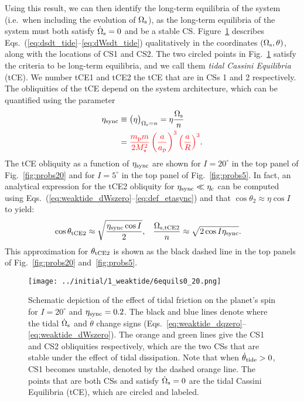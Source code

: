 \documentclass[
        fleqn,
        usenatbib,
    ]{mnras}
\newcommand*{\p}[1]{\left(#1\right)}
\begin{document}
Using this result, we can then identify the long-term equilibria of the system
(i.e.\ when including the evolution of $\Omega_{\rm s}$), as the long-term
equilibria of the system must both satisfy $\dot{\Omega}_{\rm s} = 0$ and be a
stable CS\@. Figure~\ref{fig:6equils} describes
Eqs.~(\ref{eq:dsdt_tide}--\ref{eq:dWsdt_tide}) qualitatively in the coordinates
$(\Omega_{\rm s}, \theta)$, along with the locations of CS1 and CS2. The two
circled points in Fig.~\ref{fig:6equils} satisfy the criteria to be long-term
equilibria, and we call them \emph{tidal Cassini Equilibria} (tCE). We number
tCE1 and tCE2 the tCE that are in CSs 1 and 2 respectively. The obliquities of
the tCE depend on the system architecture, which can be quantified using the
parameter
\begin{align}
    \eta_{\rm sync} &\equiv \big(\eta\big)_{\Omega_{\rm s} = n}
        = \eta \frac{\Omega_{\rm s}}{n}\nonumber\\
        &= \textcolor{red}{\frac{m_{\rm p}m}{2M_\star^2}\p{\frac{a}{a_{\rm
            p}}}^3 \p{\frac{a}{R}}^3}. \label{eq:def_etasync}
\end{align}
The tCE obliquity as a function of $\eta_{\rm sync}$ are shown for $I =
20^\circ$ in the top panel of Fig.~\ref{fig:probs20} and for $I = 5^\circ$ in
the top panel of Fig.~\ref{fig:probs5}. In fact, an analytical expression for
the tCE2 obliquity for $\eta_{\rm sync} \ll \eta_{\rm c}$ can be computed using
Eqs.~(\ref{eq:weaktide_dWszero}--\ref{eq:def_etasync}) and that $\cos \theta_2
\approx \eta \cos I$ to yield:
\begin{align}
    \cos \theta_{\rm tCE2} &\approx \sqrt{\frac{\eta_{\rm sync} \cos I}{2}},
        &
    \frac{\Omega_{\rm s, tCE2}}{n} &\approx
        \sqrt{2\cos I \eta_{\rm sync}}. \label{eq:def_tce2_approx}
\end{align}
This approximation for $\theta_{\rm tCE2}$ is shown as the black dashed line in
the top panels of Fig.~\ref{fig:probs20} and~\ref{fig:probs5}.
\begin{figure}
    \centering
    \texttt{[image: ../initial/1\_weaktide/6equils0\_20.png]}
    \caption{Schematic depiction of the effect of tidal friction on the planet's
    spin for $I = 20^\circ$ and $\eta_{\rm sync} = 0.2$. The black and blue lines
    denote where the tidal $\dot{\Omega}_{\rm s}$ and $\dot{\theta}$ change
    signs (Eqs.~\ref{eq:weaktide_dqzero}--\ref{eq:weaktide_dWszero}). The orange
    and green lines give the CS1 and CS2 obliquities respectively, which are the
    two CSs that are stable under the effect of tidal dissipation. Note that
    when $\dot{\theta}_{\rm tide} > 0$, CS1 becomes unstable, denoted by the
    dashed orange line. The points that are both CSs and satisfy
    $\dot{\Omega}_{\rm s} = 0$ are the tidal Cassini Equilibria (tCE), which are
    circled and labeled. }\label{fig:6equils}
\end{figure}
\end{document}
